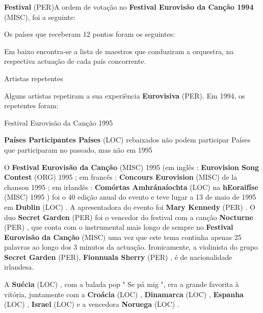 \documentclass[12pt,a4paper]{article}
\begin{document}
\textbf{Festival} (PER)A ordem de votação no \textbf{Festival Eurovisão da Canção 1994} (MISC), foi a seguinte:

Os países que receberam 12 pontos foram os seguintes:

Em baixo encontra-se a lista de maestros que conduziram a orquestra, na respectiva actuação de cada país concorrente.



Artistas repetentes

Alguns artistas repetiram a sua experiência \textbf{Eurovisiva} (PER). Em 1994, os repetentes foram:



Festival Eurovisão da Canção 1995



\textbf{Países Participantes Países} (LOC) rebaixados não podem participar Países que participaram no passado, mas não em 1995

O \textbf{Festival Eurovisão da Canção} (MISC) 1995 (em inglês : \textbf{Eurovision Song Contest} (ORG) 1995 ; em francês : \textbf{Concours Eurovision} (MISC) de la chanson 1995 ; em irlandês : \textbf{Comórtas Amhránaíochta} (LOC) na \textbf{hEoraifíse} (MISC) 1995 ) foi o 40 edição anual do evento e teve lugar a 13 de maio de 1995 em \textbf{Dublin} (LOC) . A apresentadora do evento foi \textbf{Mary Kennedy} (PER) . O duo \textbf{Secret Garden} (PER) foi o vencedor do festival com a canção \textbf{Nocturne} (PER) , que conta com o instrumental mais longo de sempre no \textbf{Festival Eurovisão da Canção} (MISC) uma vez que este tema continha apenas 25 palavras ao longo dos 3 minutos da actuação. Ironicamente, a violinista do grupo \textbf{Secret Garden} (PER), \textbf{Fionnuala Sherry} (PER) , é de nacionalidade irlandesa.

A \textbf{Suécia} (LOC) , com a balada pop " Se på mig ", era a grande favorita à vitória, juntamente com a \textbf{Croácia} (LOC) , \textbf{Dinamarca} (LOC) , \textbf{Espanha} (LOC) , \textbf{Israel} (LOC) e a vencedora \textbf{Noruega} (LOC) .
\end{document}
